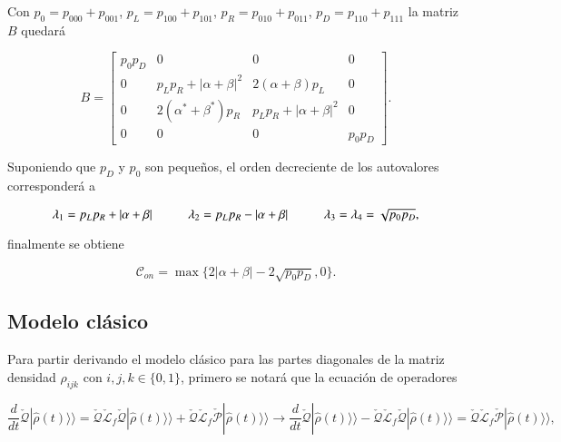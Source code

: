 \begin{appendixs}
Con  $p_{0}=p_{000}+p_{001}$, $p_{L}=p_{100} + p_{101}$, $p_{R}=p_{010}+p_{011}$, $p_{D}=p_{110}+p_{111}$ la matriz $B$ quedará

\begin{equation*}
    B = 
    \begin{bmatrix}
        p_{0}p_{D} & 0 & 0 & 0  \\
        0 & p_{L}p_{R}+|\alpha+\beta|^{2} & 2(\alpha + \beta)p_{L} & 0  \\
        0 & 2(\alpha^{*} +\beta^{*})p_{R} & p_{L}p_{R}+|\alpha+\beta|^{2}  & 0  \\
        0 & 0 & 0 & p_{0}p_{D}
        \end{bmatrix}.
\end{equation*}

Suponiendo que $p_{D}$ y $p_{0}$ son pequeños, el orden decreciente de los autovalores corresponderá a

\begin{equation*}
    \lambda_{1} = p_{L}p_{R} + |\alpha + \beta| \hspace{10mm}  \lambda_{2} = p_{L}p_{R} - |\alpha + \beta| \hspace{10mm} \lambda_{3}=\lambda_{4} = \sqrt{p_{0}p_{D}},
\end{equation*}

finalmente se obtiene

\begin{equation*}
    \mathcal{C}_{on} = \max\{ 2|\alpha+\beta| - 2\sqrt{p_{0}p_{D}},0\}.
\end{equation*}

\label{appendix5final}

\subsection{Modelo clásico}
Para partir derivando el modelo clásico para las partes diagonales de la matriz densidad $\rho_{ijk}$ con $i,j,k \in \{0,1\}$, primero se notará que la ecuación de operadores

\begin{equation*}
    \frac{d}{dt}\check{\mathcal{Q}}|\hat{\rho}(t)\rangle \rangle = \check{\mathcal{Q}}\check{\mathcal{L}}_{f}\check{\mathcal{Q}}|\hat{\rho}(t)\rangle \rangle + \check{\mathcal{Q}}\check{\mathcal{L}}_{f}\check{\mathcal{P}}|\hat{\rho}(t)\rangle \rangle \to \frac{d}{dt}\check{\mathcal{Q}}|\hat{\rho}(t)\rangle \rangle - \check{\mathcal{Q}}\check{\mathcal{L}}_{f}\check{\mathcal{Q}}|\hat{\rho}(t)\rangle \rangle = \check{\mathcal{Q}}\check{\mathcal{L}}_{f}\check{\mathcal{P}}|\hat{\rho}(t)\rangle \rangle ,
\end{equation*}


\end{appendixs}
